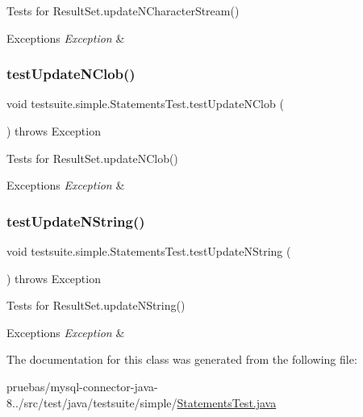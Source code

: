 Tests for Result\+Set.\+update\+N\+Character\+Stream()


\begin{DoxyExceptions}{Exceptions}
{\em Exception} & \\
\hline
\end{DoxyExceptions}
\mbox{\label{classtestsuite_1_1simple_1_1_statements_test_a659cc0e7a3ffc297310c1397fd769983}} 
\subsubsection{\texorpdfstring{test\+Update\+N\+Clob()}{testUpdateNClob()}}
{\footnotesize\ttfamily void testsuite.\+simple.\+Statements\+Test.\+test\+Update\+N\+Clob (\begin{DoxyParamCaption}{ }\end{DoxyParamCaption}) throws Exception}

Tests for Result\+Set.\+update\+N\+Clob()


\begin{DoxyExceptions}{Exceptions}
{\em Exception} & \\
\hline
\end{DoxyExceptions}
\mbox{\label{classtestsuite_1_1simple_1_1_statements_test_a4e41b5f592b49aa789051d554d859a7b}} 
\subsubsection{\texorpdfstring{test\+Update\+N\+String()}{testUpdateNString()}}
{\footnotesize\ttfamily void testsuite.\+simple.\+Statements\+Test.\+test\+Update\+N\+String (\begin{DoxyParamCaption}{ }\end{DoxyParamCaption}) throws Exception}

Tests for Result\+Set.\+update\+N\+String()


\begin{DoxyExceptions}{Exceptions}
{\em Exception} & \\
\hline
\end{DoxyExceptions}


The documentation for this class was generated from the following file\+:\begin{DoxyCompactItemize}
\item 
pruebas/mysql-\/connector-\/java-\/8../src/test/java/testsuite/simple/\mbox{\hyperlink{_statements_test_8java}{Statements\+Test.\+java}}\end{DoxyCompactItemize}
